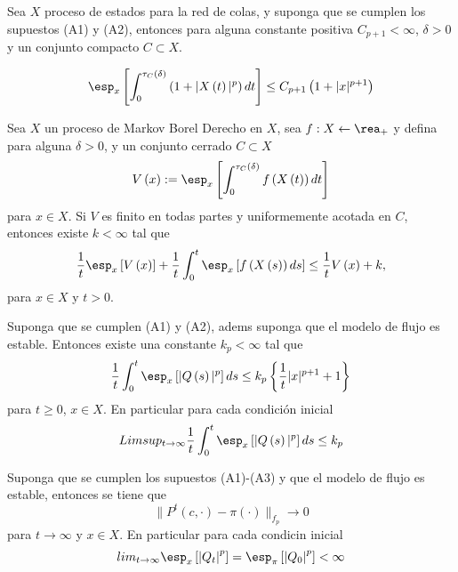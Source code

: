 \begin{Prop}
Sea $X$ proceso de estados para la red de colas, y suponga que se
cumplen los supuestos (A1) y (A2), entonces para alguna constante
positiva $C_{p+1}<\infty$, $\delta>0$ y un conjunto compacto
$C\subset X$.

\begin{equation}\label{Eq.5.4}
\esp_{x}\left[\int_{0}^{\tau_{C}\left(\delta\right)}\left(1+|X\left(t\right)|^{p}\right)dt\right]\leq
C_{p+1}\left(1+|x|^{p+1}\right)
\end{equation}
\end{Prop}

\begin{Prop}
Sea $X$ un proceso de Markov Borel Derecho en $X$, sea
$f:X\leftarrow\rea_{+}$ y defina para alguna $\delta>0$, y un
conjunto cerrado $C\subset X$
\[V\left(x\right):=\esp_{x}\left[\int_{0}^{\tau_{C}\left(\delta\right)}f\left(X\left(t\right)\right)dt\right]\]
para $x\in X$. Si $V$ es finito en todas partes y uniformemente
acotada en $C$, entonces existe $k<\infty$ tal que
\begin{equation}\label{Eq.5.11}
\frac{1}{t}\esp_{x}\left[V\left(x\right)\right]+\frac{1}{t}\int_{0}^{t}\esp_{x}\left[f\left(X\left(s\right)\right)ds\right]\leq\frac{1}{t}V\left(x\right)+k,
\end{equation}
para $x\in X$ y $t>0$.
\end{Prop}


\begin{Teo}
Suponga que se cumplen (A1) y (A2), adems suponga que el modelo
de flujo es estable. Entonces existe una constante $k_{p}<\infty$
tal que
\begin{equation}\label{Eq.5.13}
\frac{1}{t}\int_{0}^{t}\esp_{x}\left[|Q\left(s\right)|^{p}\right]ds\leq
k_{p}\left\{\frac{1}{t}|x|^{p+1}+1\right\}
\end{equation}
para $t\geq0$, $x\in X$. En particular para cada condici\'on inicial
\begin{equation}\label{Eq.5.14}
Limsup_{t\rightarrow\infty}\frac{1}{t}\int_{0}^{t}\esp_{x}\left[|Q\left(s\right)|^{p}\right]ds\leq
k_{p}
\end{equation}
\end{Teo}

\begin{Teo}\label{Tma.6.2}
Suponga que se cumplen los supuestos (A1)-(A3) y que el modelo de
flujo es estable, entonces se tiene que
\[\parallel P^{t}\left(c,\cdot\right)-\pi\left(\cdot\right)\parallel_{f_{p}}\rightarrow0\]
para $t\rightarrow\infty$ y $x\in X$. En particular para cada
condicin inicial
\[lim_{t\rightarrow\infty}\esp_{x}\left[\left|Q_{t}\right|^{p}\right]=\esp_{\pi}\left[\left|Q_{0}\right|^{p}\right]<\infty\]
\end{Teo}


